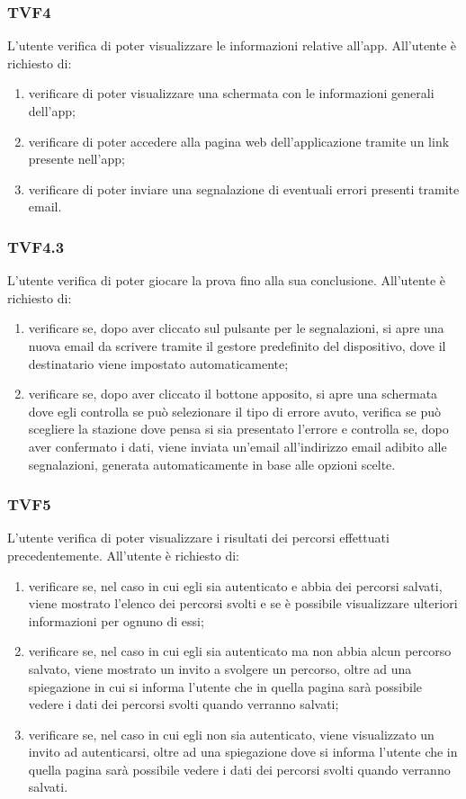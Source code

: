 		\subsubsection{TVF4}
			L'utente verifica di poter visualizzare le informazioni relative all'app.
			All'utente è richiesto di:
			\begin{enumerate}
				\item verificare di poter visualizzare una schermata con le informazioni generali dell'app;
				\item verificare di poter accedere alla pagina web dell'applicazione tramite un link presente nell'app;
				\item verificare di poter inviare una segnalazione di eventuali errori presenti tramite email.
			\end{enumerate}
		\subsubsection{TVF4.3}
			L'utente verifica di poter giocare la prova fino alla sua conclusione.
			All'utente è richiesto di:
			\begin{enumerate}
				\item verificare se, dopo aver cliccato sul pulsante per le segnalazioni, si apre una nuova email da scrivere tramite il gestore predefinito del dispositivo, dove il destinatario viene impostato automaticamente;
				\item verificare se, dopo aver cliccato il bottone apposito, si apre una schermata dove egli controlla se può selezionare il tipo di errore avuto, verifica se può scegliere la stazione dove pensa si sia presentato l'errore e controlla se, dopo aver confermato i dati, viene inviata un'email all'indirizzo email adibito alle segnalazioni, generata automaticamente in base alle opzioni scelte.
			\end{enumerate}
		\subsubsection{TVF5}
			L'utente verifica di poter visualizzare i risultati dei percorsi effettuati precedentemente.
			All'utente è richiesto di:
			\begin{enumerate}
				\item verificare se, nel caso in cui egli sia autenticato e abbia dei percorsi salvati, viene mostrato l'elenco dei percorsi svolti e se è possibile visualizzare ulteriori informazioni per ognuno di essi;
				\item verificare se, nel caso in cui egli sia autenticato ma non abbia alcun percorso salvato, viene mostrato un invito a svolgere un percorso, oltre ad una spiegazione in cui si informa l'utente che in quella pagina sarà possibile vedere i dati dei percorsi svolti quando verranno salvati;
				\item verificare se, nel caso in cui egli non sia autenticato, viene visualizzato un invito ad autenticarsi, oltre ad una spiegazione dove si informa l'utente che in quella pagina sarà possibile vedere i dati dei percorsi svolti quando verranno salvati.
			\end{enumerate}
